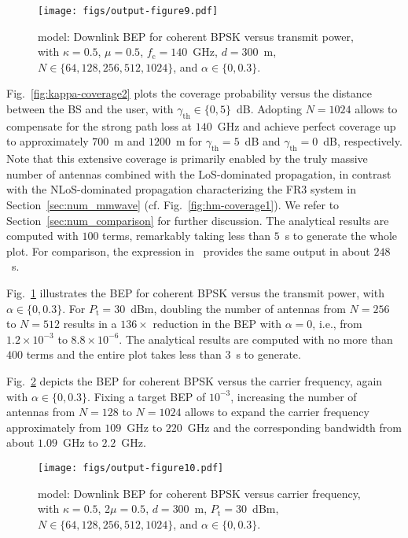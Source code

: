 \documentclass[journal,twocolumn]{IEEEtran}
\begin{document}
\begin{figure}[t]
    \centering
    \texttt{[image: figs/output-figure9.pdf]}
    \caption{\km{} model: Downlink \ac{BEP} for coherent \ac{BPSK} versus transmit power, with $\kappa = 0.5$, $\mu = 0.5$, $f_\textrm{c} = 140$~GHz, $d = 300$~m, $N \in \{64, 128, 256, 512, 1024\}$, and $\alpha\in\{0,0.3\}$.}
    \label{fig:kappa-bep-pt}
\end{figure}

Fig.~\ref{fig:kappa-coverage2} plots the coverage probability versus the distance between the \ac{BS} and the user, with $\gamma_\textrm{th} \in \{0, 5\}$~dB. 
Adopting $N=1024$ allows to compensate for the strong path loss at $140$~GHz and achieve perfect coverage up to approximately $700$~m and $1200$~m for $\gamma_{\textrm{th}} =5$~dB and $\gamma_{\textrm{th}} =0$~dB, respectively. Note that this extensive coverage is primarily enabled by the truly massive number of antennas combined with the \ac{LoS}-dominated propagation, in contrast with the \ac{NLoS}-dominated propagation characterizing the FR3 system in Section~\ref{sec:num_mmwave} (cf. Fig.~\ref{fig:hm-coverage1}). We refer to Section~\ref{sec:num_comparison} for further discussion. The analytical results are computed with $100$ terms, remarkably taking less than $5$~s to generate the whole plot. For comparison, the expression in~\cite{Mil08} provides the same output in about $248$~s.

Fig.~\ref{fig:kappa-bep-pt} illustrates the \ac{BEP} for coherent \ac{BPSK} versus the transmit power, with $\alpha\in \{0,0.3\}$.
For $P_\textrm{t} = 30$~dBm, doubling the number of antennas from $N = 256$ to $N = 512$ results in a $136 \times$ reduction in the \ac{BEP} with $\alpha = 0$, i.e., from $1.2 \times 10^{-3}$ to $8.8 \times 10^{-6}$. The analytical results are computed with no more than $400$ terms and the entire plot takes less than $3$~s to generate.


Fig.~\ref{fig:kappa-bep-freq} depicts the \ac{BEP} for coherent \ac{BPSK} versus the carrier frequency, again with $\alpha\in\{0, 0.3\}$.
Fixing a target \ac{BEP} of $10^{-3}$, increasing the number of antennas from $N=128$ to $N=1024$ allows to expand the carrier frequency approximately from $109$~GHz to $220$~GHz and the corresponding bandwidth from about $1.09$~GHz to $2.2$~GHz.

\begin{figure}[t]
    \centering
    \texttt{[image: figs/output-figure10.pdf]}
    \caption{\km{} model: Downlink \ac{BEP} for coherent \ac{BPSK} versus carrier frequency, with $\kappa = 0.5$, 2$\mu = 0.5$, $d = 300$~m, $P_{\textrm{t}} = 30$~dBm, $N \in \{64,128,256,512,1024\}$, and $\alpha \in\{0,0.3\}$.}
    \label{fig:kappa-bep-freq}
\end{figure}
\end{document}

